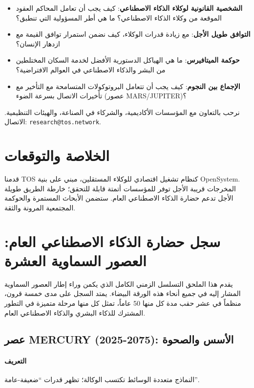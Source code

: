 \documentclass[11pt]{article}
\begin{document}
\begin{itemize}[noitemsep]
  \item \textbf{الشخصية القانونية لوكلاء الذكاء الاصطناعي}: كيف يجب أن تعامل المحاكم العقود الموقعة من وكلاء الذكاء الاصطناعي؟ ما هي أطر المسؤولية التي تنطبق؟
  \item \textbf{التوافق طويل الأجل}: مع زيادة قدرات الوكلاء، كيف نضمن استمرار توافق القيمة مع ازدهار الإنسان؟
  \item \textbf{حوكمة الميتافيرس}: ما هي الهياكل الدستورية الأفضل لخدمة السكان المختلطين من البشر والذكاء الاصطناعي في العوالم الافتراضية؟
  \item \textbf{الإجماع بين النجوم}: كيف يجب أن تتعامل البروتوكولات المتسامحة مع التأخير مع تأخيرات الاتصال بسرعة الضوء (عصور MARS/JUPITER)؟
\end{itemize}

نرحب بالتعاون مع المؤسسات الأكاديمية، والشركاء في الصناعة، والهيئات التنظيمية. الاتصال: \texttt{research@tos.network}.

\section{الخلاصة والتوقعات}
قدمنا TOS كنظام تشغيل اقتصادي للوكلاء المستقلين، مبني على بنية OpenSystem. المخرجات قريبة الأجل توفر للمؤسسات أتمتة قابلة للتحقق؛ خارطة الطريق طويلة الأجل تدعم حضارة الذكاء الاصطناعي العام. ستضمن الأبحاث المستمرة والحوكمة المجتمعية المرونة والثقة.

\appendix
\newpage

\section{سجل حضارة الذكاء الاصطناعي العام: العصور السماوية العشرة}
\label{appendix:chronicle}

يقدم هذا الملحق التسلسل الزمني الكامل الذي يكمن وراء إطار العصور السماوية المشار إليه في جميع أنحاء هذه الورقة البيضاء. يمتد السجل على مدى خمسة قرون، منظماً في عشر حقب مدة كل منها 50 عاماً، تمثل كل منها مرحلة متميزة في التطور المشترك للذكاء البشري والذكاء الاصطناعي العام.

\subsection{عصر MERCURY (2025-2075): الأسس والصحوة}
\paragraph{التعريف} النماذج متعددة الوسائط تكتسب الوكالة؛ تظهر قدرات ``ضعيفة-عامة''.
\end{document}
